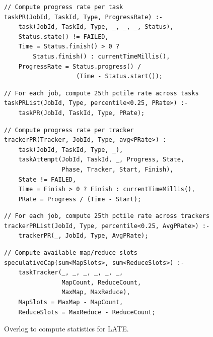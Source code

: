 \begin{figure}[p]
\begin{small}
\begin{verbatim}
// Compute progress rate per task
taskPR(JobId, TaskId, Type, ProgressRate) :- 
    task(JobId, TaskId, Type, _, _, _, Status), 
    Status.state() != FAILED,  
    Time = Status.finish() > 0 ?
        Status.finish() : currentTimeMillis(), 
    ProgressRate = Status.progress() / 
                    (Time - Status.start()); 
\end{verbatim}
\end{small}
\begin{small}
\begin{verbatim}
// For each job, compute 25th pctile rate across tasks
taskPRList(JobId, Type, percentile<0.25, PRate>) :- 
    taskPR(JobId, TaskId, Type, PRate); 
\end{verbatim}
\end{small}
\begin{small}
\begin{verbatim}
// Compute progress rate per tracker
trackerPR(Tracker, JobId, Type, avg<PRate>) :- 
    task(JobId, TaskId, Type, _), 
    taskAttempt(JobId, TaskId, _, Progress, State, 
                Phase, Tracker, Start, Finish), 
    State != FAILED, 
    Time = Finish > 0 ? Finish : currentTimeMillis(), 
    PRate = Progress / (Time - Start);  
\end{verbatim}
\end{small}
\begin{small}
\begin{verbatim}
// For each job, compute 25th pctile rate across trackers
trackerPRList(JobId, Type, percentile<0.25, AvgPRate>) :- 
    trackerPR(_, JobId, Type, AvgPRate); 
\end{verbatim}
\end{small}
\begin{small}
\begin{verbatim}
// Compute available map/reduce slots
speculativeCap(sum<MapSlots>, sum<ReduceSlots>) :-
    taskTracker(_, _, _, _, _, _,  
                MapCount, ReduceCount,
                MaxMap, MaxReduce),
    MapSlots = MaxMap - MapCount,
    ReduceSlots = MaxReduce - ReduceCount;
\end{verbatim}
\end{small}
\vspace{-12pt}
\caption{Overlog to compute statistics for LATE.}
\label{fig:latePolicy}
\end{figure}

